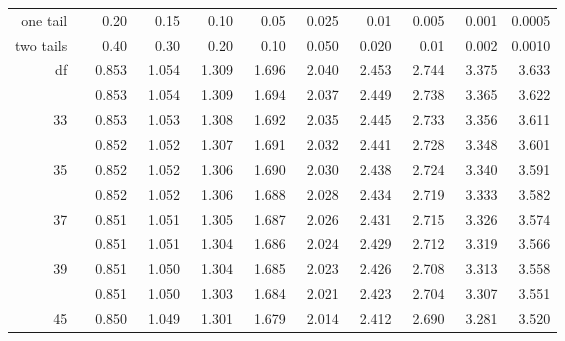 \begin{center}
\begin{tabular}{r | rrr rr rrrr}
\hline
one tail & \hspace{1.5mm}  0.20  &   0.15  &   0.10  &   0.05  &   0.025 &   0.01  &   0.005 &   0.001 &   0.0005 \\
two tails & \hspace{1.5mm}  0.40  &   0.30  &   0.20  &   0.10  &   0.050 &   0.020  &   0.01 &   0.002 &   0.0010\\
\hline
df \quad        31	&	~0.853	&	~1.054	&	~1.309	&	~1.696	&	~2.040	&	~2.453	&	~2.744	&	~3.375	&	~3.633	\\
\gray   32	&	~0.853	&	~1.054	&	~1.309	&	~1.694	&	~2.037	&	~2.449	&	~2.738	&	~3.365	&	~3.622	\\
        33	&	~0.853	&	~1.053	&	~1.308	&	~1.692	&	~2.035	&	~2.445	&	~2.733	&	~3.356	&	~3.611	\\
\gray   34  &	~0.852	&	~1.052	&	~1.307	&	~1.691	&	~2.032	&	~2.441	&	~2.728	&	~3.348	&	~3.601	\\
        35	&	~~0.852	&	~1.052	&	~1.306	&	~1.690	&	~2.030	&	~2.438	&	~2.724	&	~3.340	&	~3.591	\\
\hline
\gray   36	&	~0.852	&	~1.052	&	~1.306	&	~1.688	&	~2.028	&	~2.434	&	~2.719	&	~3.333	&	~3.582	\\
        37	&	~0.851	&	~1.051	&	~1.305	&	~1.687	&	~2.026	&	~2.431	&	~2.715	&	~3.326	&	~3.574	\\
\gray   38	&	~0.851	&	~1.051	&	~1.304	&	~1.686	&	~2.024	&	~2.429	&	~2.712	&	~3.319	&	~3.566	\\
        39	&	~0.851	&	~1.050	&	~1.304	&	~1.685	&	~2.023	&	~2.426	&	~2.708	&	~3.313	&	~3.558	\\
\gray   40	&	~0.851	&	~1.050	&	~1.303	&	~1.684	&	~2.021	&	~2.423	&	
~2.704	&	~3.307	&	~3.551	\\
\hline
\hline
        45	&	~0.850	&	~1.049	&	~1.301	&	~1.679	&	~2.014	&	~2.412	&	~2.690	&	~3.281	&	~3.520	\\

\end{tabular}
\end{center}
